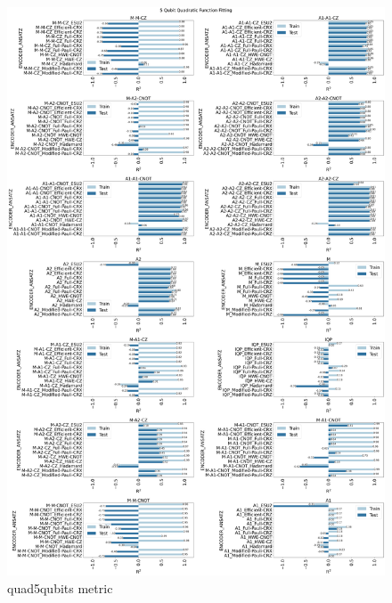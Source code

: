 \documentclass[journal=jacsat,manuscript=article]{achemso}
\begin{document}
\begin{figure}[H]
	\centering
	\includegraphics[width=0.8\linewidth]{images/5qubit_Quadratic_funcfit_R2.png}
	\caption{quad5qubits metric}
	\label{fig:quad5qubits_metric}
\end{figure}
\end{document}
